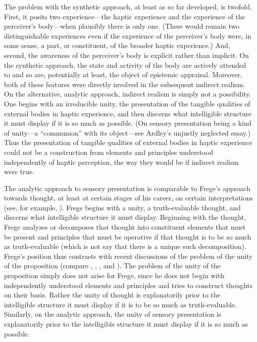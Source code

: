 The problem with the synthetic approach, at least as so far developed, is twofold. First, it posits two experience---the haptic experience and the experience of the perceiver's body---when plausibly there is only one. (These would remain two distinguishable experiences even if the experience of the perceiver's body were, in some sense, a part, or constituent, of the broader haptic experience.) And, second, the awareness of the perceiver's body is explicit rather than implicit. On the synthetic approach, the state and activity of the body are actively attended to and so are, potentially at least, the object of epistemic appraisal. Moreover, both of these features were directly involved in the subsequent indirect realism. On the alternative, analytic approach, indirect realism is simply not a possibility. One begins with an irreducible unity, the presentation of the tangible qualities of external bodies in haptic experience, and then discerns what intelligible structure it must display if it is so much as possible. (On sensory presentation being a kind of unity---a ``communion'' with its object---see Ardley's \citeyear{Ardley:1958aa} unjustly neglected essay.) Thus the presentation of tangible qualities of external bodies in haptic experience could not be a construction from elements and principles understood independently of haptic perception, the way they would be if indirect realism were true.

The analytic approach to sensory presentation is comparable to Frege's approach towards thought, at least at certain stages of his career, on certain interpretations (see, for example, \citealt[essays 7 and 9]{Travis:2011qd}). Frege begins with a unity, a truth-evaluable thought, and discerns what intelligible structure it must display. Beginning with the thought, Frege analyzes or decomposes that thought into constituent elements that must be present and principles that must be operative if that thought is to be so much as truth-evaluable (which is not say that there is a unique such decomposition). Frege's position thus contrasts with recent discussions of the problem of the unity of the proposition (compare \citealt{King:2007ad}, \citealt{Gaskin:2008aa}, \citealt{Soames:2010qq}, and \citealt{King:2014ls}). The problem of the unity of the proposition simply does not arise for Frege, since he does not begin with independently understood elements and principles and tries to construct thoughts on their basis. Rather the unity of thought is explanatorily prior to the intelligible structure it must display if it is to be so much as truth-evaluable. Similarly, on the analytic approach, the unity of sensory presentation is explanatorily prior to the intelligible structure it must display if it is so much as possible.

